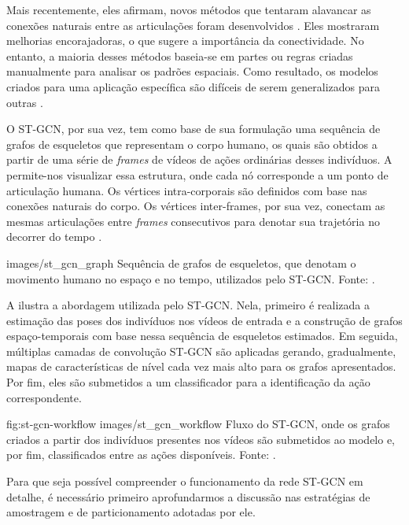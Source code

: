 Mais recentemente, eles afirmam, novos métodos que tentaram alavancar as conexões naturais entre as articulações foram desenvolvidos \cite{shahroudy-2016, yong-du-2015}. Eles mostraram melhorias encorajadoras, o que sugere a importância da conectividade. No entanto, a maioria desses métodos baseia-se em partes ou regras criadas manualmente para analisar os padrões espaciais. Como resultado, os modelos criados para uma aplicação específica são difíceis de serem generalizados para outras \cite{st-gcn-2018}.

O ST-GCN, por sua vez, tem como base de sua formulação uma sequência de grafos de esqueletos que representam o corpo humano, os quais são obtidos a partir de uma série de \textit{frames} de vídeos de ações ordinárias desses indivíduos. A  permite-nos visualizar essa estrutura, onde cada nó corresponde a um ponto de articulação humana. Os vértices intra-corporais são definidos com base nas conexões naturais do corpo. Os vértices inter-frames, por sua vez, conectam as mesmas articulações entre \textit{frames} consecutivos para denotar sua trajetória no decorrer do tempo \cite{st-gcn-2018}.

    {images/st_gcn_graph}
    {Sequência de grafos de esqueletos, que denotam o movimento humano no espaço e no tempo, utilizados pelo ST-GCN. Fonte: \cite[p. 1]{st-gcn-2018}.}

A  ilustra a abordagem utilizada pelo ST-GCN. Nela, primeiro é realizada a estimação das poses dos indivíduos nos vídeos de entrada e a construção de grafos espaço-temporais com base nessa sequência de esqueletos estimados. Em seguida, múltiplas camadas de convolução ST-GCN são aplicadas gerando, gradualmente, mapas de características de nível cada vez mais alto para os grafos apresentados. Por fim, eles são submetidos a um classificador para a identificação da ação correspondente.

\image
    {fig:st-gcn-workflow}
    {images/st_gcn_workflow}
    {Fluxo do ST-GCN, onde os grafos criados a partir dos indivíduos presentes nos vídeos são submetidos ao modelo e, por fim, classificados entre as ações disponíveis. Fonte: \cite[p. 3]{st-gcn-2018}.}



Para que seja possível compreender o funcionamento da rede ST-GCN em detalhe, é necessário primeiro aprofundarmos a discussão nas estratégias de amostragem e de particionamento adotadas por ele. 

